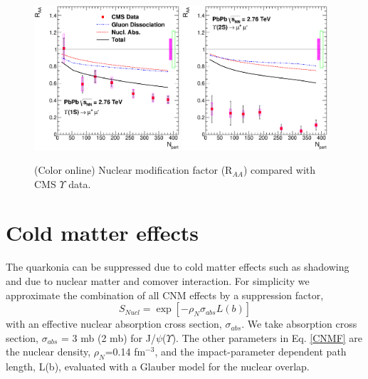 \documentclass[aps,prc,preprint,superscriptaddress,showpacs,showkeys]{revtex4-1}
\begin{document}
\begin{figure}
\includegraphics[width=0.48\textwidth]{CMS_RAA_Upsilon.eps}
\includegraphics[width=0.48\textwidth]{CMS_RAA_Upsilon2S.eps}
\caption{(Color online) Nuclear modification factor (R$_{AA}$) compared with CMS $\Upsilon$ data. }
\label{fig:UpsilonRaa}
\end{figure}

 
\section{Cold matter effects}
The quarkonia can be suppressed due to cold matter effects such as shadowing and due to nuclear
matter and comover interaction. For simplicity we approximate the combination of all CNM effects 
by a suppression factor,
\begin{equation}
  S_{Nucl}=\exp[-\rho_{N}\sigma_{abs}L(b)]
  \label{CNMF}
\end{equation}
with an effective nuclear absorption cross section, $\sigma_{abs}$.
We take absorption cross section, $\sigma_{abs}$ = 3 mb (2 mb) for
J/$\psi$($\Upsilon$). The other parameters in Eq. \ref{CNMF} are the nuclear density,
$\rho_N$=0.14 fm$^{-3}$, and the impact-parameter dependent path length, L(b), evaluated 
with a Glauber model \cite{GM_PShukla} for the nuclear overlap.
\end{document}
